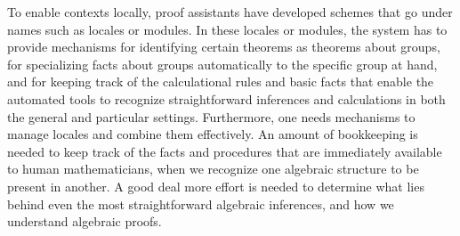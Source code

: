 \documentclass{article}
\begin{document}
To enable contexts locally, proof assistants have developed schemes that go
under names such as locales or modules. In these locales or modules, the system
has to provide mechanisms for identifying certain theorems as theorems about
groups, for specializing facts about groups automatically to the specific
group at hand, and for keeping track of the calculational rules and basic facts
that enable the automated tools to recognize straightforward inferences and
calculations in both the general and particular settings. Furthermore, one needs
mechanisms to manage locales and combine them effectively. An amount of
bookkeeping is needed to keep track of the facts and procedures that are
immediately available to human mathematicians, when we recognize one algebraic
structure to be present in another. A good deal more effort is needed to
determine what lies behind even the most straightforward algebraic inferences,
and how we understand algebraic proofs.
\end{document}
